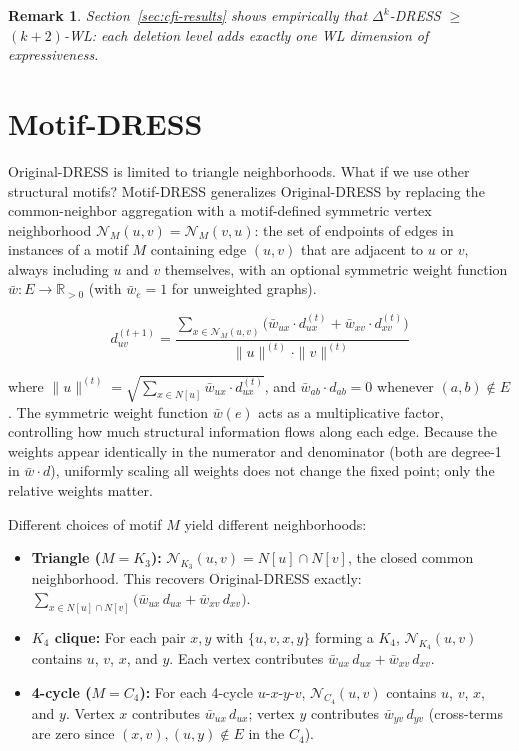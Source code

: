 \documentclass[11pt,a4paper]{article}
\newtheorem{remark}[theorem]{Remark}
\begin{document}
\begin{remark}
Section~\ref{sec:cfi-results} shows empirically that $\Delta^k$-DRESS $\geq$ $(k+2)$-WL: each deletion level adds exactly one WL dimension of expressiveness.
\end{remark}

\section{Motif-DRESS}
Original-DRESS is limited to triangle neighborhoods. What if we use other structural motifs? Motif-DRESS generalizes Original-DRESS by replacing the common-neighbor aggregation with a motif-defined symmetric vertex neighborhood $\mathcal{N}_M(u,v) = \mathcal{N}_M(v,u)$: the set of endpoints of edges in instances of a motif $M$ containing edge $(u,v)$ that are adjacent to $u$ or $v$, always including $u$ and $v$ themselves, with an optional symmetric weight function $\bar{w}: E \to \mathbb{R}_{>0}$ (with $\bar{w}_e = 1$ for unweighted graphs).

\begin{equation}
d_{uv}^{(t+1)} = \frac{\displaystyle\sum_{x \in \mathcal{N}_M(u,v)} \bigl(\bar{w}_{ux} \cdot d_{ux}^{(t)} + \bar{w}_{xv} \cdot d_{xv}^{(t)}\bigr)}{\|u\|^{(t)} \cdot \|v\|^{(t)}}
\end{equation}

where $\|u\|^{(t)} = \sqrt{\sum_{x \in N[u]} \bar{w}_{ux} \cdot d_{ux}^{(t)}}$, and $\bar{w}_{ab} \cdot d_{ab} = 0$ whenever $(a,b) \notin E$. The symmetric weight function $\bar{w}(e)$ acts as a multiplicative factor, controlling how much structural information flows along each edge. Because the weights appear identically in the numerator and denominator (both are degree-1 in $\bar{w} \cdot d$), uniformly scaling all weights does not change the fixed point; only the relative weights matter.

Different choices of motif $M$ yield different neighborhoods:
\begin{itemize}
    \item \textbf{Triangle ($M = K_3$):} $\mathcal{N}_{K_3}(u,v) = N[u] \cap N[v]$, the closed common neighborhood. This recovers Original-DRESS exactly: $\sum_{x \in N[u] \cap N[v]} \bigl(\bar{w}_{ux}\,d_{ux} + \bar{w}_{xv}\,d_{xv}\bigr)$.
    \item \textbf{$K_4$ clique:} For each pair $x, y$ with $\{u,v,x,y\}$ forming a $K_4$, $\mathcal{N}_{K_4}(u,v)$ contains $u$, $v$, $x$, and $y$. Each vertex contributes $\bar{w}_{ux}\,d_{ux} + \bar{w}_{xv}\,d_{xv}$.
    \item \textbf{4-cycle ($M = C_4$):} For each 4-cycle $u$-$x$-$y$-$v$, $\mathcal{N}_{C_4}(u,v)$ contains $u$, $v$, $x$, and $y$. Vertex $x$ contributes $\bar{w}_{ux}\,d_{ux}$; vertex $y$ contributes $\bar{w}_{yv}\,d_{yv}$ (cross-terms are zero since $(x,v), (u,y) \notin E$ in the $C_4$).
\end{itemize}
\end{document}
